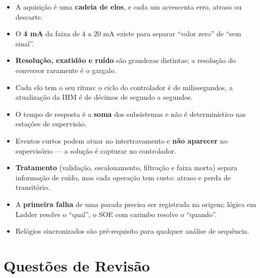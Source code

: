 \begin{itemize}
\tightlist
\item
  A aquisição é uma \textbf{cadeia de elos}, e cada um acrescenta erro, atraso ou descarte.
\item
  O \textbf{4 mA} da faixa de 4 a 20 mA existe para separar ``valor zero'' de ``sem sinal''.
\item
  \textbf{Resolução, exatidão e ruído} são grandezas distintas; a resolução do conversor raramente é o gargalo.
\item
  Cada elo tem o seu ritmo: o ciclo do controlador é de milissegundos, a atualização da IHM é de décimos de segundo a segundos.
\item
  O tempo de resposta é a \textbf{soma} dos subsistemas e não é determinístico nas estações de supervisão.
\item
  Eventos curtos podem atuar no intertravamento e \textbf{não aparecer} no supervisório --- a solução é capturar no controlador.
\item
  \textbf{Tratamento} (validação, escalonamento, filtração e faixa morta) separa informação de ruído, mas cada operação tem custo: atraso e perda de transitório.
\item
  A \textbf{primeira falha} de uma parada precisa ser registrada na origem; lógica em Ladder resolve o ``qual'', o SOE com carimbo resolve o ``quando''.
\item
  Relógios sincronizados são pré-requisito para qualquer análise de sequência.
\end{itemize}

\section{Questões de Revisão}\label{questuxf5es-de-revisuxe3o}

